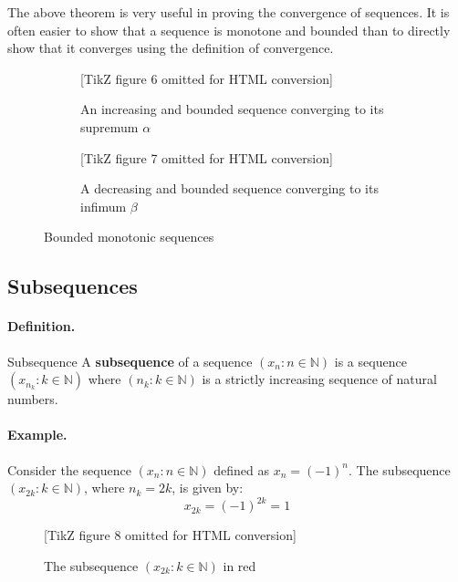 \documentclass[openany]{book}
\numberwithin{equation}{section}
\begin{document}
    The above theorem is very useful in proving the convergence of sequences. It is often easier to show that a sequence is monotone and bounded than to directly show that it converges using the definition of convergence.
\par
\begin{figure}[H]
    \centering
\begin{subfigure}{0.45\textwidth}
    

[TikZ figure 6 omitted for HTML conversion]

    \caption{An increasing and bounded sequence converging to its supremum $\alpha$}
\end{subfigure}
\begin{subfigure}{0.45\textwidth}
    

[TikZ figure 7 omitted for HTML conversion]

    \caption{A decreasing and bounded sequence converging to its infimum $\beta$}
\end{subfigure}
\caption{Bounded monotonic sequences}
\end{figure}
\subsection{Subsequences}
\paragraph{Definition.}

{Subsequence}
    A \textbf{subsequence} of a sequence $(x_n : n \in \mathbb{N})$ is a sequence $(x_{n_k} : k \in \mathbb{N})$ where $(n_k : k \in \mathbb{N})$ is a strictly increasing sequence of natural numbers.
\par

\paragraph{Example.}

    Consider the sequence $(x_n : n \in \mathbb{N})$ defined as $x_n = (-1)^n$. The subsequence $(x_{2k} : k \in \mathbb{N})$, where $n_k = 2k$, is given by:
    $$x_{2k} = (-1)^{2k} = 1$$
    \begin{figure}[H]
        \centering
        

[TikZ figure 8 omitted for HTML conversion]

        \caption{The subsequence $(x_{2k} : k \in \mathbb{N})$ in red}
    \end{figure}
\par
\end{document}
